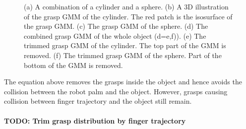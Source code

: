 \begin{figure}
\begin{minipage}[c]{1\textwidth}
    \end{minipage}

\caption{\scriptsize{(a) A combination of a cylinder and a sphere. (b) A 3D illustration of the grasp GMM of the cylinder. The red patch is the isosurface of the grasp GMM. (c) The grasp GMM of the sphere. (d) The combined grasp GMM of the whole object (d={e,f})). (e) The trimmed grasp GMM of the cylinder. The top part of the GMM is removed. (f) The trimmed grasp GMM of the sphere. Part of the bottom of the GMM is removed.}}
\label{fig:object}
\end{figure}


The equation above removes the grasps inside the object and hence avoids the collision between the robot palm and the object. However, grasps causing collision between finger trajectory and the object still remain.

\paragraph{TODO: Trim grasp distribution by finger trajectory} ~\\


